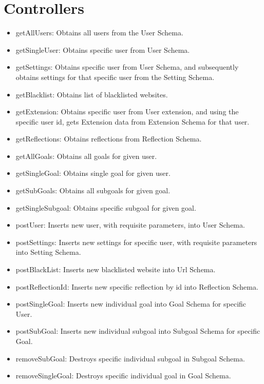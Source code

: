 \documentclass[letterpaper, 10 pt]{report}
\begin{document}
\section{Controllers}
\begin{itemize}
 \item getAllUsers: Obtains all users from the User Schema.
 \item getSingleUser: Obtains specific user from User Schema.
 \item getSettings: Obtains specific user from User Schema, and subsequently obtains settings for that specific user from the Setting Schema.
 \item getBlacklist: Obtains list of blacklisted websites.
 \item getExtension: Obtains specific user from User extension, and using the specific user id, gets Extension data from Extension Schema for that user.
 \item getReflections: Obtains reflections from Reflection Schema.
 \item getAllGoals: Obtains all goals for given user.
 \item getSingleGoal: Obtains single goal for given user.
 \item getSubGoals: Obtains all subgoals for given goal.
 \item getSingleSubgoal: Obtains specific subgoal for given goal.
 
 \item postUser: Inserts new user, with requisite parameters, into User Schema.
 \item postSettings: Inserts new settings for specific user, with requisite parameters into Setting Schema.
 \item postBlackList: Inserts new blacklisted website into Url Schema.
 \item postReflectionId: Inserts new specific reflection by id into Reflection Schema.
 \item postSingleGoal: Inserts new individual goal into Goal Schema for specific User.
 \item postSubGoal: Inserts new individual subgoal into Subgoal Schema for specific Goal.
 
 \item removeSubGoal: Destroys specific individual subgoal in Subgoal Schema.
 \item removeSingleGoal: Destroys specific individual goal in Goal Schema.
 
\end{itemize}
\newpage
%

\end{document}
